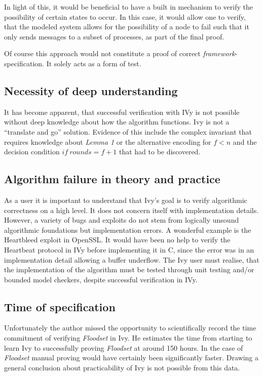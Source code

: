 \documentclass[fleqn]{article}
\begin{document}
In light of this, it would be beneficial to have a built in mechanism to verify the possibility of certain states to occur. In this case, it would allow one to verify, that the modeled system allows for the possibility of a node to fail such that it only sends messages to a subset of processes, as part of the final proof.

Of course this approach would not constitute a proof of correct \textit{framework}-specification. It solely acts as a form of test.

\subsection{Necessity of deep understanding}
It has become apparent, that successful verification with IVy is not possible without deep knowledge about how the algorithm functions. Ivy is not a ``translate and go'' solution.
Evidence of this include the complex invariant that requires knowledge about \textit{Lemma 1} or the alternative encoding for $f<n$ and the decision condition $if\ rounds = f+1$ that had to be discovered.

\subsection{Algorithm failure in theory and practice}
As a user it is important to understand that Ivy's goal is to verify algorithmic correctness on a high level. It does not concern itself with implementation details. However, a variety of bugs and exploits do not stem from logically unsound algorithmic foundations but implementation errors. A wonderful example is the Heartbleed exploit in OpenSSL. It would have been no help to verify the Heartbeat protocol in IVy before implementing it in C, since the error was in an implementation detail allowing a buffer underflow. The Ivy user must realise, that the implementation of the algorithm must be tested through unit testing and/or bounded model checkers, despite successful verification in IVy.

\subsection{Time of specification}
Unfortunately the author missed the opportunity to scientifically record the time commitment of verifying \textit{Floodset} in Ivy. He estimates the time from starting to learn Ivy to successfully proving \textit{Floodset} at around 150 hours. In the case of \textit{Floodset} manual proving would have certainly been significantly faster. Drawing a general conclusion about practicability of Ivy is not possible from this data.
\end{document}
